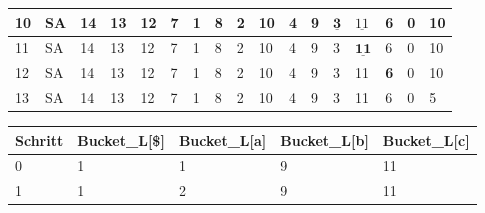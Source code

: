 \begin{table}
{\begin{tabular}{l|l|lllllllllllllll}
			10      & SA & 14          & 13                                  & 12                                  & 7          & 1          & 8                         & 2                         & 10          & 4          & \cellcolor[HTML]{34CDF9}9               & $\underline{\textbf{3}}$                & $\underline{11}$                         & 6                         & 0                         & 10                        \\ \hline
			11      & SA & 14          & 13                                  & 12                                  & 7          & 1          & 8                         & 2                         & 10          & 4          & 9                                       & \cellcolor[HTML]{34CDF9}3               & $\underline{\textbf{11}}$                & 6                         & 0                         & 10                        \\ \hline
			12      & SA & 14          & 13                                  & 12                                  & 7          & 1          & 8                         & 2                         & 10          & 4          & 9                                       & 3                                       & \cellcolor[HTML]{34CDF9}11               & \textbf{6}                & 0                         & 10                        \\ \hline
			13      & SA & 14          & 13                                  & 12                                  & 7          & 1          & 8                         & 2                         & 10          & 4          & 9                                       & 3                                       & 11                                       & 6                         & 0                         & \cellcolor[HTML]{32CB00}5 \\ \hline
		\end{tabular}%
	}
	\centering
	\begin{tabular}{l|l|l|l|l}
		Schritt & Bucket\_L{[}\${]} & Bucket\_L{[}a{]}          & Bucket\_L{[}b{]}           & Bucket\_L{[}c{]}           \\ \hline
		0       & 1                 & 1                         & 9                          & 11                         \\ \hline
		1       & 1                 & \cellcolor[HTML]{32CB00}2 & 9                          & 11                         \\ \hline

\end{tabular}
\end{table}
